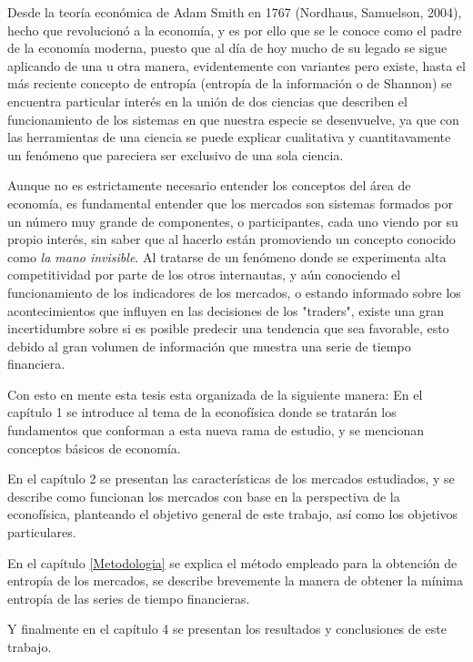 Desde la teor\'ia econ\'omica de Adam Smith en 1767 (Nordhaus, Samuelson, 2004), hecho que revolucion\'o a la econom\'ia, y es por ello que se le conoce como el padre de la econom\'ia moderna, puesto que al d\'ia de hoy mucho de su legado se sigue aplicando de una u otra manera, evidentemente con variantes pero existe, hasta el más reciente concepto de entropía (entropía de la información o de Shannon) se encuentra particular interés en la unión de dos ciencias que describen el funcionamiento de los sistemas en que nuestra especie se desenvuelve, ya que con las herramientas de una ciencia se puede explicar cualitativa y cuantitavamente un fenómeno que pareciera ser exclusivo de una sola ciencia.
\newline

Aunque no es estrictamente necesario entender los conceptos del \'area de econom\'ia, es fundamental entender que los mercados son sistemas formados por un n\'umero muy grande de componentes, o participantes, cada uno viendo por su propio inter\'es, sin saber que al hacerlo est\'an promoviendo un concepto conocido como \textit{la mano invisible}. Al tratarse de un fen\'omeno donde se experimenta alta competitividad por parte de los otros internautas, y a\'un conociendo el funcionamiento de los indicadores de los mercados, o estando informado sobre los acontecimientos que influyen en las decisiones de los "traders", existe una gran incertidumbre sobre si es posible predecir una tendencia que sea favorable, esto debido al gran volumen de información que muestra una serie de tiempo financiera. 
\newline

Con esto en mente esta tesis esta organizada de la siguiente manera:\newline 
En el capítulo 1 se introduce al tema de la econofísica donde se tratarán los fundamentos que conforman a esta nueva rama de estudio, y se mencionan conceptos básicos de economía.
\newline

En el capítulo 2 se presentan las características de los mercados estudiados, y se describe como funcionan los mercados con base en la perspectiva de la econofísica, planteando el objetivo general de este trabajo, así como los objetivos particulares.\newline

En el capítulo \ref{Metodologia} se explica el método empleado para la obtención de entropía de los mercados, se describe brevemente la manera de obtener la mínima entropía de las series de tiempo financieras.
\newline

Y finalmente en el capítulo 4 se presentan los resultados y conclusiones de este trabajo.



